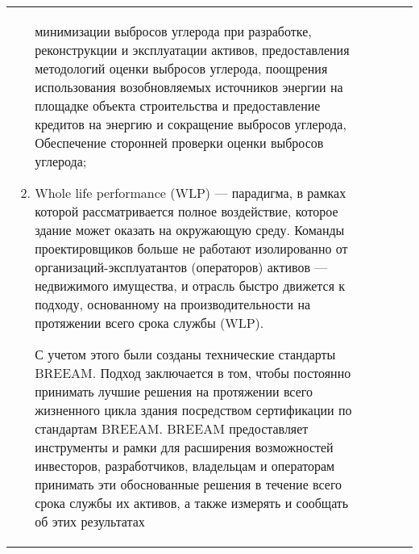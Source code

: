 \begin{landscape}
\begin{center}
\begin{longtable}{|m{40mm}|p{40mm}|p{40mm}|p{55mm}|p{55mm}|}
\begin{enumerate}[1)]
                                минимизации выбросов углерода при разработке, реконструкции и эксплуатации активов, предоставления методологий оценки выбросов углерода,
                                поощрения использования возобновляемых источников энергии на площадке объекта строительства и предоставление кредитов на энергию и сокращение выбросов углерода,
                                Обеспечение сторонней проверки оценки выбросов углерода;
                            \item Whole life performance (WLP) --- парадигма, в рамках которой рассматривается полное воздействие, которое здание может оказать на окружающую среду.
                                Команды проектировщиков больше не работают изолированно от организаций-эксплуатантов (операторов) активов --- недвижимого имущества, и отрасль быстро движется к подходу,
                                основанному на производительности на протяжении всего срока службы (WLP).
                            
                                С учетом этого были созданы технические стандарты BREEAM. Подход заключается в том, чтобы постоянно принимать лучшие решения
                                на протяжении всего жизненного цикла здания посредством сертификации по стандартам BREEAM.
                                BREEAM предоставляет инструменты и рамки для расширения возможностей инвесторов, разработчиков,
                                владельцам и операторам принимать эти обоснованные решения в течение всего срока службы их активов, а также измерять и сообщать об этих результатах
                                

\end{enumerate}
\end{longtable}
\end{center}
\end{landscape}
